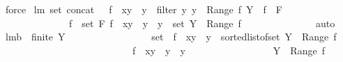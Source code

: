\begin{isabellebody}
\ force%
\endisatagproof
{\isafoldproof}%
%
\isadelimproof
\isanewline
%
\endisadelimproof
\isanewline
\isanewline
{}\isamarkupfalse%
\ lm{}{}{\isacharcolon}\ {\isachardoublequoteopen}set\ {\isacharparenleft}concat\ {\isacharbrackleft}\ {\isacharbrackleft}\ f\ {\isasymunion}\ {\isacharbraceleft}{\isacharparenleft}x{\isacharcomma}y{\isacharparenright}{\isacharbraceright}\ {\isachardot}\ y\ {\isasymleftarrow}\ {\isacharparenleft}filter\ {\isacharparenleft}{\isacharpercent}y{\isachardot}\ y\ {\isasymnotin}\ Range\ f{\isacharparenright}\ Y{\isacharparenright}\ {\isacharbrackright}{\isachardot}\ f\ {\isasymleftarrow}\ F\ {\isacharbrackright}{\isacharparenright}\ {\isacharequal}\isanewline
\ \ \ \ \ \ \ \ \ \ \ \ \ {\isacharparenleft}{\isasymUnion}\ f\ {\isasymin}\ set\ F{\isachardot}\ {\isacharbraceleft}f\ {\isasymunion}\ {\isacharbraceleft}{\isacharparenleft}x{\isacharcomma}y{\isacharparenright}{\isacharbraceright}\ {\isacharbar}\ y\ {\isachardot}\ y\ {\isasymin}\ {\isacharparenleft}set\ Y{\isacharparenright}\ {\isacharminus}\ {\isacharparenleft}Range\ f{\isacharparenright}{\isacharbraceright}{\isacharparenright}{\isachardoublequoteclose}\ \isanewline
%
\isadelimproof
\ \ \ \ \ \ \ \ \ \ \ \ %
\endisadelimproof
%
\isatagproof
{}\isamarkupfalse%
\ auto%
\endisatagproof
{\isafoldproof}%
%
\isadelimproof
\isanewline
%
\endisadelimproof
\isanewline
\isanewline
{}\isamarkupfalse%
\ lm{}{}b{\isacharcolon}\ \ {\isachardoublequoteopen}finite\ Y{\isachardoublequoteclose}\ \isanewline
\ \ \ \ \ \ \ \ \ \ \ \ \ \ \ \ {\isachardoublequoteopen}set\ {\isacharbrackleft}\ f\ {\isacharplus}{\isacharasterisk}\ {\isacharbraceleft}{\isacharparenleft}x{\isacharcomma}y{\isacharparenright}{\isacharbraceright}\ {\isachardot}\ y\ {\isasymleftarrow}\ sorted{\isacharunderscore}list{\isacharunderscore}of{\isacharunderscore}set\ {\isacharparenleft}Y\ {\isacharminus}\ {\isacharparenleft}Range\ f{\isacharparenright}{\isacharparenright}\ {\isacharbrackright}\ {\isacharequal}\isanewline
\ \ \ \ \ \ \ \ \ \ \ \ \ \ \ \ \ \ \ \ \ {\isacharbraceleft}\ \ \ \ \ \ f\ {\isacharplus}{\isacharasterisk}\ {\isacharbraceleft}{\isacharparenleft}x{\isacharcomma}y{\isacharparenright}{\isacharbraceright}\ {\isacharbar}\ y\ {\isachardot}\ y\ {\isasymin}\ \ \ \ \ \ \ \ \ \ \ \ \ \ \ \ \ Y\ {\isacharminus}\ {\isacharparenleft}Range\ f{\isacharparenright}{\isacharbraceright}{\isachardoublequoteclose}\ \isanewline
%
\isadelimproof
\ \ \ \ \ \ \ \ \ \ \ \ \ %
\endisadelimproof
%
\isatagproof

\end{isabellebody}
